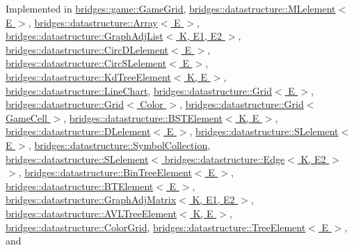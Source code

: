 Implemented in \hyperlink{classbridges_1_1game_1_1_game_grid_a07da19700a077e3d0f2cde2cade2ba60}{bridges\+::game\+::\+Game\+Grid}, \hyperlink{classbridges_1_1datastructure_1_1_m_lelement_a735c3cb43648b4d4e7d3316cdc1a1952}{bridges\+::datastructure\+::\+M\+Lelement$<$ E $>$}, \hyperlink{classbridges_1_1datastructure_1_1_array_a3b6d694fe5d336a0a15951d522852e51}{bridges\+::datastructure\+::\+Array$<$ E $>$}, \hyperlink{classbridges_1_1datastructure_1_1_graph_adj_list_adf1bfde5ec7192f3ee334695059f8fa6}{bridges\+::datastructure\+::\+Graph\+Adj\+List$<$ K, E1, E2 $>$}, \hyperlink{classbridges_1_1datastructure_1_1_circ_d_lelement_aec7f9b9dc6626c1a872feb91cd65425d}{bridges\+::datastructure\+::\+Circ\+D\+Lelement$<$ E $>$}, \hyperlink{classbridges_1_1datastructure_1_1_circ_s_lelement_a775ba08a7811fe91c396cb27ba9343ab}{bridges\+::datastructure\+::\+Circ\+S\+Lelement$<$ E $>$}, \hyperlink{classbridges_1_1datastructure_1_1_kd_tree_element_a76f6d9bfadfdec09d0a8564aa0e33235}{bridges\+::datastructure\+::\+Kd\+Tree\+Element$<$ K, E $>$}, \hyperlink{classbridges_1_1datastructure_1_1_line_chart_a431e49c31cdd5f46e978742776306dfa}{bridges\+::datastructure\+::\+Line\+Chart}, \hyperlink{classbridges_1_1datastructure_1_1_grid_a16aeae38446b96f440dea15f2b19334d}{bridges\+::datastructure\+::\+Grid$<$ E $>$}, \hyperlink{classbridges_1_1datastructure_1_1_grid_a16aeae38446b96f440dea15f2b19334d}{bridges\+::datastructure\+::\+Grid$<$ Color $>$}, \hyperlink{classbridges_1_1datastructure_1_1_grid_a16aeae38446b96f440dea15f2b19334d}{bridges\+::datastructure\+::\+Grid$<$ Game\+Cell $>$}, \hyperlink{classbridges_1_1datastructure_1_1_b_s_t_element_a2bb8cc9ec4b6bc5b89ecef0f17be366f}{bridges\+::datastructure\+::\+B\+S\+T\+Element$<$ K, E $>$}, \hyperlink{classbridges_1_1datastructure_1_1_d_lelement_a736ba8e6901608fb0ab04d781d2cceee}{bridges\+::datastructure\+::\+D\+Lelement$<$ E $>$}, \hyperlink{classbridges_1_1datastructure_1_1_s_lelement_a602156aacacd73d1faa365d68d8af31b}{bridges\+::datastructure\+::\+S\+Lelement$<$ E $>$}, \hyperlink{classbridges_1_1datastructure_1_1_symbol_collection_a8f63c31a48a12127978967b706fc38f5}{bridges\+::datastructure\+::\+Symbol\+Collection}, \hyperlink{classbridges_1_1datastructure_1_1_s_lelement_a602156aacacd73d1faa365d68d8af31b}{bridges\+::datastructure\+::\+S\+Lelement$<$ bridges\+::datastructure\+::\+Edge$<$ K, E2 $>$ $>$}, \hyperlink{classbridges_1_1datastructure_1_1_bin_tree_element_aef86e3663785972251547e409fdc757b}{bridges\+::datastructure\+::\+Bin\+Tree\+Element$<$ E $>$}, \hyperlink{classbridges_1_1datastructure_1_1_b_t_element_a2118b6b74f3fe0fec39e3b258a7dee89}{bridges\+::datastructure\+::\+B\+T\+Element$<$ E $>$}, \hyperlink{classbridges_1_1datastructure_1_1_graph_adj_matrix_a2f8c67da1078354156fc646097152c6d}{bridges\+::datastructure\+::\+Graph\+Adj\+Matrix$<$ K, E1, E2 $>$}, \hyperlink{classbridges_1_1datastructure_1_1_a_v_l_tree_element_ab04d1e9ad4630e408041e8137dc9854a}{bridges\+::datastructure\+::\+A\+V\+L\+Tree\+Element$<$ K, E $>$}, \hyperlink{classbridges_1_1datastructure_1_1_color_grid_afad945d648b427ca183a1dface8249b7}{bridges\+::datastructure\+::\+Color\+Grid}, \hyperlink{classbridges_1_1datastructure_1_1_tree_element_a897f34ea284da45e1dc869c3e3b6c9a4}{bridges\+::datastructure\+::\+Tree\+Element$<$ E $>$}, and 